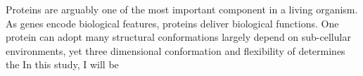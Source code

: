 Proteins are arguably one of the most important component in a living organism. As genes encode biological features, proteins deliver biological functions. One protein can adopt many structural conformations largely depend on sub-cellular environments, yet three dimensional conformation and flexibility of  determines the     In this study, I will be 